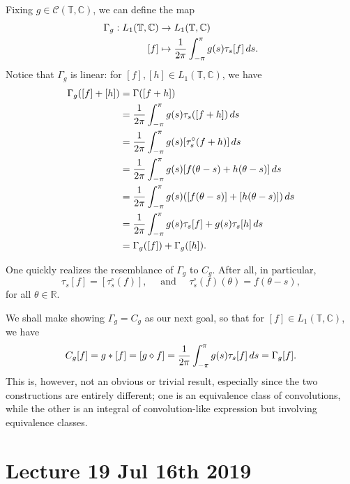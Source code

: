 \documentclass[notoc,notitlepage]{tufte-book}
\begin{document}
Fixing $g \in \mathcal{C}(\mathbb{T}, \mathbb{C})$,
we can define the map
\begin{align*}
  \Gamma_g : L_1(\mathbb{T}, \mathbb{C}) &\to L_1(\mathbb{T}, \mathbb{C}) \\
      [f] &\mapsto \frac{1}{2\pi} \int_{-\pi}^{\pi} g(s)\tau_s[f] \mathop{}\!d{s}.
\end{align*}
Notice that $\Gamma_g$ is linear: for $[f], [h] \in L_1(\mathbb{T}, \mathbb{C})$,
we have
\begin{align*}
  \Gamma_g([f] + [h])
  &= \Gamma([f + h]) \\
  &= \frac{1}{2\pi} \int_{-\pi}^{\pi} g(s) \tau_s([f + h]) \mathop{}\!d{s} \\
  &= \frac{1}{2\pi} \int_{-\pi}^{\pi} g(s)[\tau_s^{\circ}(f + h)] \mathop{}\!d{s} \\
  &= \frac{1}{2\pi} \int_{-\pi}^{\pi} g(s)[f(\theta - s) + h(\theta - s)] \mathop{}\!d{s} \\
  &= \frac{1}{2\pi} \int_{-\pi}^{\pi} g(s)
    ([f(\theta - s)] + [h(\theta - s)]) \mathop{}\!d{s} \\
  &= \frac{1}{2\pi} \int_{-\pi}^{\pi} g(s)\tau_s[f] + g(s)\tau_s[h] \mathop{}\!d{s} \\
  &= \Gamma_g([f]) + \Gamma_g([h]).
\end{align*}

One quickly realizes the resemblance of $\Gamma_g$ to
\hyperref[defn:convolution_operator_with_kernel]{$C_g$}.
After all, in particular,
\begin{equation*}
  \tau_s[f] = [\tau_s^\circ(f)], \quad \text{ and } \quad
  \tau_s^\circ(f)(\theta) = f(\theta - s),
\end{equation*}
for all $\theta \in \mathbb{R}$.

We shall make showing $\Gamma_g = C_g$ as our next goal, so that
for $[f] \in L_1(\mathbb{T}, \mathbb{C})$, we have
\begin{equation*}
  C_g[f] = g * [f] = [g \diamond f]
  = \frac{1}{2\pi} \int_{-\pi}^{\pi} g(s) \tau_s[f] \mathop{}\!d{s} = \Gamma_g[f].
\end{equation*}
This is, however, not an obvious or trivial result,
especially since the two constructions are entirely different;
one is an equivalence class of convolutions,
while the other is an integral of convolution-like expression
but involving equivalence classes.



\chapter{Lecture 19 Jul 16th 2019}%
\label{chp:lecture_19_jul_16th_2019}
\end{document}
